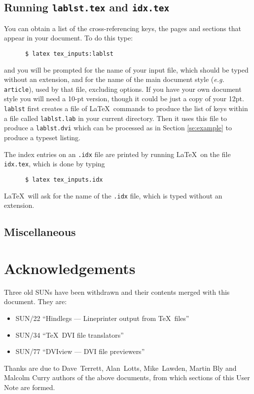 \subsection{Running \mbox{\tt lablst.tex} and \mbox{\tt idx.tex}}
\label{se:lablstidx}
You can obtain a list of the cross-referencing keys, the pages and sections
that appear in your document. To do this type:
\begin{verbatim}
      $ latex tex_inputs:lablst
\end{verbatim}
and you will be prompted for the name of your input file, which should be
typed without an extension, and for the name of the main document style
({\em e.g.} \mbox{\tt article}), used by that file, excluding options. 
If you have your own document style you will need a 10-pt version, though
it could be just a copy of your 12pt. \mbox{\tt lablst} first creates a file
of \LaTeX\ commands to produce the list of keys within a file called
\mbox{\tt lablst.lab} in your current directory.  Then it uses this file to
produce a \mbox{\tt lablst.dvi} which can be processed as in Section
\ref{se:example} to produce a typeset listing. 

The index entries on an \mbox{\tt .idx} file are printed by running \LaTeX\
on the file \mbox{\tt idx.tex}, which is done by typing
\begin{verbatim}
      $ latex tex_inputs.idx
\end{verbatim}
\LaTeX\ will ask for the name of the \mbox{\tt .idx} file, which is typed
without an extension.


\subsection{Miscellaneous}
\label{se:misc}

\section{Acknowledgements}

Three old SUNs have been withdrawn and their contents merged with this
document. They are:
\begin{itemize}
\item SUN/22 ``Hindlegs --- Lineprinter output from \TeX\ files''
\item SUN/34 ``\TeX\ DVI file translators''
\item SUN/77 ``DVIview --- DVI file previewers''
\end{itemize}

Thanks are due to Dave~Terrett, Alan~Lotts, Mike~Lawden, Martin Bly and 
Malcolm Curry authors of the above documents, from which sections of this
User Note are formed.

